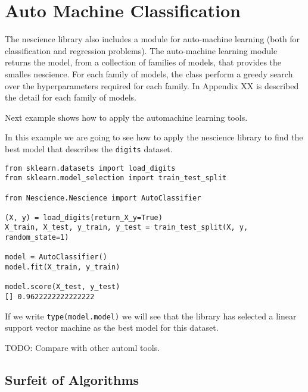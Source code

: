 %
%

\section{Auto Machine Classification}
\label{sec:machine_learning_classification}

The nescience library also includes a module for auto-machine learning (both for classification and regression problems). The auto-machine learning module returns the model, from a collection of families of models, that provides the smalles nescience. For each family of models, the class perform a greedy search over the hyperparameters required for each family. In Appendix XX is described the detail for each family of models.

Next example shows how to apply the automachine learning tools.

\begin{example}
\label{ex:automl}

In this example we are going to see how to apply the nescience library to find the best model that describes the \texttt{digits} dataset.

\begin{sourcecode}
{\scriptsize \begin{verbatim}
from sklearn.datasets import load_digits
from sklearn.model_selection import train_test_split

from Nescience.Nescience import AutoClassifier

(X, y) = load_digits(return_X_y=True)
X_train, X_test, y_train, y_test = train_test_split(X, y, random_state=1)

model = AutoClassifier()
model.fit(X_train, y_train)

model.score(X_test, y_test)
[] 0.9622222222222222
\end{verbatim}}

If we write \texttt{type(model.model)} we will see that the library has selected a linear support vector machine as the best model for this dataset.

\end{sourcecode}
\end{example}

{\color{red} TODO: Compare with other automl tools.}

\subsection{Surfeit of Algorithms}

